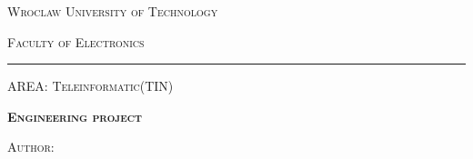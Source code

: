 \titlepage
\addtolength{\textheight}{1.8cm}
\addtolength{\textwidth}{0.2cm}
\addtolength{\topmargin}{-2.2cm}
\enlargethispage{3cm}
\begin{center}
	\begin{Huge}
		\textsc{Wroclaw University of Technology}
	\end{Huge}

	\begin{huge}
		\vspace{1ex}
		\textsc{Faculty of Electronics}
	\end{huge}
	\rule[-0.3ex]{\textwidth}{1pt}
	
	\begin{flushleft}
		\begin{large}
			\vspace{0.4cm}
			\textsc{AREA: Teleinformatic(TIN)} \newline
		\end{large}
	\end{flushleft}

	\begin{center}
		\begin{Huge}
			\vspace{1.7ex}
			\textsc{\textbf{Engineering project}} 

		\end{Huge}
	\end{center}
	\vspace{1cm}
		
	\begin{flushright}
		\begin{minipage}[t][4cm][t]{11cm}
			\begin{center}
				\begin{large}
					\temat
				\end{large}
			\end{center}
			\vspace{0.3cm}
			\begin{center}
				\begin{large}
					\tematen
				\end{large}
			\end{center}
		\end{minipage}
	\end{flushright}
				
	\begin{flushright}
		\begin{minipage}[t]{10cm}
			\begin{flushleft}
				\begin{large}
					\vspace{0.3cm}
					\begin{large}
						\textsc{Author:}\newline
						\autor\newline
					\end{large}
					

\end{large}
\end{flushleft}
\end{minipage}
\end{flushright}
\end{center}

